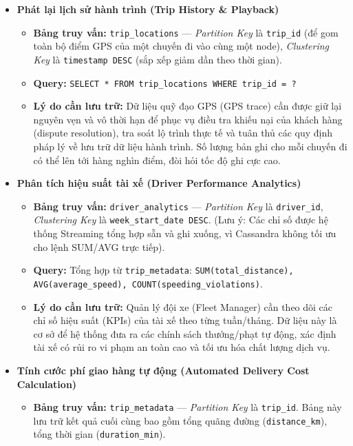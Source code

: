 \begin{itemize}
\item \textbf{Phát lại lịch sử hành trình (Trip History \& Playback)}
    \begin{itemize}
        \item \textbf{Bảng truy vấn:} \texttt{trip\_locations} — \textit{Partition Key} là \texttt{trip\_id} (để gom toàn bộ điểm GPS của một chuyến đi vào cùng một node), \textit{Clustering Key} là \texttt{timestamp DESC} (sắp xếp giảm dần theo thời gian).
        \item \textbf{Query:} \texttt{SELECT * FROM trip\_locations WHERE trip\_id = ?}
        \item \textbf{Lý do cần lưu trữ:} Dữ liệu quỹ đạo GPS (GPS trace) cần được giữ lại nguyên vẹn và vô thời hạn để phục vụ điều tra khiếu nại của khách hàng (dispute resolution), tra soát lộ trình thực tế và tuân thủ các quy định pháp lý về lưu trữ dữ liệu hành trình. Số lượng bản ghi cho mỗi chuyến đi có thể lên tới hàng nghìn điểm, đòi hỏi tốc độ ghi cực cao.
    \end{itemize}
\item \textbf{Phân tích hiệu suất tài xế (Driver Performance Analytics)}
   \begin{itemize}
        \item \textbf{Bảng truy vấn:} \texttt{driver\_analytics} — \textit{Partition Key} là \texttt{driver\_id}, \textit{Clustering Key} là \texttt{week\_start\_date DESC}. (Lưu ý: Các chỉ số được hệ thống Streaming tổng hợp sẵn và ghi xuống, vì Cassandra không tối ưu cho lệnh SUM/AVG trực tiếp).
        \item \textbf{Query:} Tổng hợp từ \texttt{trip\_metadata}: \texttt{SUM(total\_distance), AVG(average\_speed), COUNT(speeding\_violations)}.
        \item \textbf{Lý do cần lưu trữ:} Quản lý đội xe (Fleet Manager) cần theo dõi các chỉ số hiệu suất (KPIs) của tài xế theo từng tuần/tháng. Dữ liệu này là cơ sở để hệ thống đưa ra các chính sách thưởng/phạt tự động, xác định tài xế có rủi ro vi phạm an toàn cao và tối ưu hóa chất lượng dịch vụ.
    \end{itemize}   
\item \textbf{Tính cước phí giao hàng tự động (Automated Delivery Cost Calculation)}
    \begin{itemize}
        \item \textbf{Bảng truy vấn:} \texttt{trip\_metadata} — \textit{Partition Key} là \texttt{trip\_id}. Bảng này lưu trữ kết quả cuối cùng bao gồm tổng quãng đường (\texttt{distance\_km}), tổng thời gian (\texttt{duration\_min}). 

\end{itemize}
\end{itemize}
